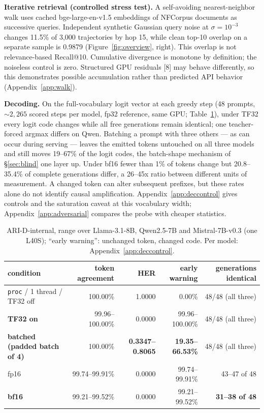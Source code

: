 \documentclass{article}
\begin{document}
\textbf{Iterative retrieval (controlled stress test).} A self-avoiding nearest-neighbor walk uses cached bge-large-en-v1.5 embeddings of NFCorpus documents as successive queries. Independent synthetic Gaussian query noise at $\sigma=10^{-3}$ changes 11.5\% of 3{,}000 trajectories by hop 15, while clean top-10 overlap on a separate sample is 0.9879 (Figure~\ref{fig:overview}, right). This overlap is not relevance-based Recall@10. Cumulative divergence is monotone by definition; the noiseless control is zero. Structured GPU residuals [8] may behave differently, so this demonstrates possible accumulation rather than predicted API behavior (Appendix~\ref{app:walk}).

\textbf{Decoding.} On the full-vocabulary logit vector at each greedy step (48 prompts, ${\sim}2{,}265$ scored steps per model, fp32 reference, same GPU; Table~\ref{tab:decoding}), under TF32 every logit code changes while all free generations remain identical; one teacher-forced argmax differs on Qwen. Batching a prompt with three others --- as can occur during serving --- leaves the emitted tokens untouched on all three models and still moves 19--67\% of the logit codes, the batch-shape mechanism of \S\ref{sec:blind} one layer up. Under bf16 fewer than 1\% of tokens change but 20.8--35.4\% of complete generations differ, a 26--45x ratio between different units of measurement. A changed token can alter subsequent prefixes, but these rates alone do not identify causal amplification. Appendix~\ref{app:deccontrol} gives controls and the saturation caveat at this vocabulary width; Appendix~\ref{app:adversarial} compares the probe with cheaper statistics.

\begin{table}[t]
\centering\caption{ARI-D-internal, range over Llama-3.1-8B, Qwen2.5-7B and Mistral-7B-v0.3 (one L40S); ``early warning'': unchanged token, changed code. Per model: Appendix~\ref{app:deccontrol}.}\label{tab:decoding}\scriptsize\setlength{\tabcolsep}{3pt}
\begin{tabular}{lrrrr}
\toprule
condition & token agreement & HER & early warning & generations identical \\
\midrule
\texttt{proc} / 1 thread / TF32 off & 100.00\% & 1.0000 & 0.00\% & 48/48 (all three) \\
\textbf{TF32 on} & 99.96--100.00\% & 0.0000 & 99.96--100.00\% & 48/48 (all three) \\
\textbf{batched (padded batch of 4)} & 100.00\% & \textbf{0.3347--0.8065} & \textbf{19.35--66.53\%} & 48/48 (all three) \\
fp16 & 99.74--99.91\% & 0.0000 & 99.74--99.91\% & 43--47 of 48 \\
\textbf{bf16} & 99.21--99.52\% & 0.0000 & 99.21--99.52\% & \textbf{31--38 of 48} \\
\bottomrule
\end{tabular}
\end{table}
\end{document}
